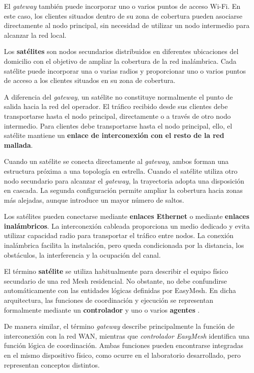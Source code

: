 El \textit{gateway} también puede incorporar uno o varios puntos de
acceso Wi-Fi. En este caso, los clientes situados dentro de su zona de
cobertura pueden asociarse directamente al nodo principal, sin necesidad
de utilizar un nodo intermedio para alcanzar la red local.

Los \textbf{satélites} son nodos secundarios distribuidos en diferentes
ubicaciones del domicilio con el objetivo de ampliar la cobertura de la
red inalámbrica. Cada satélite puede incorporar una o varias radios y
proporcionar uno o varios puntos de acceso a los clientes situados en su
zona de cobertura.

A diferencia del \textit{gateway}, un satélite no constituye normalmente
el punto de salida hacia la red del operador. El tráfico recibido desde
sus clientes debe transportarse hasta el nodo principal, directamente o
a través de otro nodo intermedio. Para clientes debe transportarse hasta el nodo principal, ello, el satélite mantiene un
\textbf{enlace de interconexión con el resto de la red mallada}.

Cuando un satélite se conecta directamente al \textit{gateway}, ambos
forman una estructura próxima a una topología en estrella. Cuando el
satélite utiliza otro nodo secundario para alcanzar el
\textit{gateway}, la trayectoria adopta una disposición en cascada. La
segunda configuración permite ampliar la cobertura hacia zonas más
alejadas, aunque introduce un mayor número de saltos.

Los satélites pueden conectarse mediante
\textbf{enlaces Ethernet} o mediante \textbf{enlaces inalámbricos}. La
interconexión cableada proporciona un medio dedicado y evita utilizar
capacidad radio para transportar el tráfico entre nodos. La conexión
inalámbrica facilita la instalación, pero queda condicionada por la
distancia, los obstáculos, la interferencia y la ocupación del canal.

El término \textbf{satélite} se utiliza habitualmente para describir el
equipo físico secundario de una red Mesh residencial. No obstante, no
debe confundirse automáticamente con las entidades lógicas definidas por
EasyMesh. En dicha arquitectura, las funciones de coordinación y
ejecución se representan formalmente mediante un
\textbf{controlador} y uno o varios \textbf{agentes}
\cite{wifi_alliance_easymesh}.

De manera similar, el término \textit{gateway} describe principalmente
la función de interconexión con la red WAN, mientras que
\textit{controlador EasyMesh} identifica una función lógica de
coordinación. Ambas funciones pueden encontrarse integradas en el mismo
dispositivo físico, como ocurre en el laboratorio desarrollado, pero
representan conceptos distintos.

